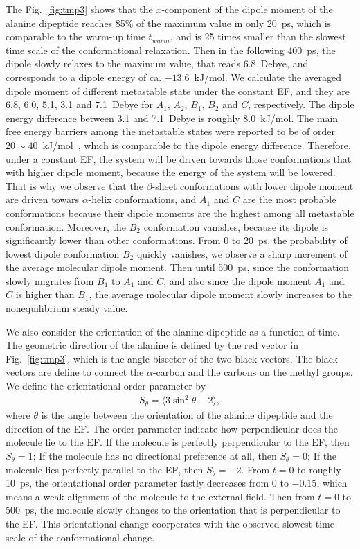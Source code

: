\documentclass[a4paper,preprint,unsortedaddress,onecolumn]{revtex4-1}
\begin{document}
The Fig.~\ref{fig:tmp3}
shows that the $x$-component of the dipole moment of the alanine dipeptide
reaches 85\% of the maximum value in only 20~ps, which is comparable to
the warm-up time $t_{warm}$, and is 25 times
smaller than the slowest time scale of the conformational relaxation.
Then in the following 400~ps, the dipole slowly relaxes to the 
maximum value, that reads
6.8~Debye, and  corresponds to a dipole energy of ca. $-13.6$~kJ/mol.
We calculate the averaged dipole moment of different metastable state
under the constant EF, and they are 6.8, 6.0, 5.1, 3.1 and 7.1~Debye
for $A_1$, $A_2$, $B_1$, $B_2$ and $C$, respectively.
The dipole energy difference between 3.1 and 7.1~Debye is roughly 8.0~kJ/mol.
The main free energy barriers among the
metastable states were reported to be of order $20\sim 40$~kJ/mol~\cite{bohner2012algorithm},
which is comparable to the dipole energy difference. 
Therefore, under a constant EF, the system will be driven towards those
conformations that with higher dipole moment, because the
energy of the system will be lowered.  That is why
we observe that the $\beta$-sheet conformations with lower dipole moment
are driven towars $\alpha$-helix conformations, 
and $A_1$ and $C$ are the most
probable conformations because their dipole moments are the highest
among all metastable conformation. Moreover, the $B_2$ conformation vanishes, because
its dipole is significantly lower than other conformations.
From 0 to 20~ps, the probability of
lowest dipole conformation $B_2$ quickly
vanishes, we observe a sharp increment of the average molecular
dipole moment. Then until 500~ps, since the conformation slowly migrates from
$B_1$ to $A_1$ and $C$, and also since the dipole moment $A_1$ and $C$
is higher than $B_1$, the average molecular dipole moment slowly increases
to the nonequilibrium steady value.


We also consider the orientation of the alanine dipeptide as a function
of time.
The geometric direction of the alanine is defined by the red vector in
Fig.~\ref{fig:tmp3}, which is the angle bisector of the two black vectors.
The black vectors are define to connect the $\alpha$-carbon and the carbons
on the methyl groups. We define the orientational order parameter by
\begin{align}
  S_\theta = \langle 3\sin^2\theta - 2\rangle,
\end{align}
where $\theta$ is the angle between the orientation of the alanine dipeptide
and the direction of the EF. The order parameter
indicate how perpendicular does the molecule lie to the EF.
If the molecule is perfectly perpendicular to the EF, then $S_\theta = 1$;
If the molecule has no directional
preference at all, then $S_\theta = 0$;
If the molecule lies perfectly parallel to the EF, then $S_\theta = -2$.
From $t=0$ to roughly 10~ps, the orientational order parameter fastly
decreases from 0 to $-0.15$, which means a weak alignment of the molecule to the external field.
Then from $t=0$ to 500~ps, the molecule slowly changes to the orientation
that is perpendicular to the EF.
This orientational change coorperates with the observed slowest
time scale of the conformational change.
\end{document}
